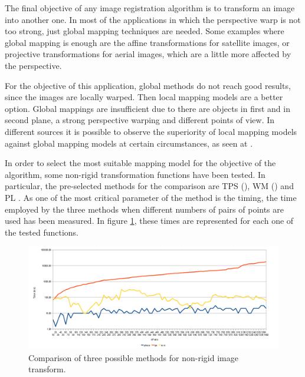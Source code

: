 The final objective of any image registration algorithm is to transform an image into another one. In most of the applications in which the perspective warp is not too strong, just global mapping techniques are needed. Some examples where global mapping is enough are the affine transformations for satellite images, or projective transformations for aerial images, which are a little more affected by the perspective.

For the objective of this application, global methods do not reach good results, since the images are locally warped. Then local mapping models are a better option. Global mappings are insufficient due to there are objects in first and in second plane, a strong perspective warping and different points of view. In different sources it is possible to observe the superiority of local mapping models against global mapping models at certain circumstances, as seen at \cite{goshtasby1988image, ehlers1994high, wiemker1996application, flusser1992adaptive}.

In order to select the most suitable mapping model for the objective of the algorithm, some non-rigid transformation functions have been tested. In particular, the pre-selected methods for the comparison are \ac{TPS} (\cite{harder1972interpolation}), \ac{WM} (\cite{goshtasby1993design}) and \ac{PL} \cite{goshtasby1986piecewise}. As one of the most critical parameter of the method is the timing, the time employed by the three methods when different numbers of pairs of points are used has been measured. In figure \ref{fig:cp02_transform_model_time}, these times are represented for each one of the tested functions.

\begin{figure}[h!]
\centering
\includegraphics[width=\textwidth]{compTransf}
\caption{Comparison of three possible methods for non-rigid image transform.}\label{fig:cp02_transform_model_time}
\end{figure}

